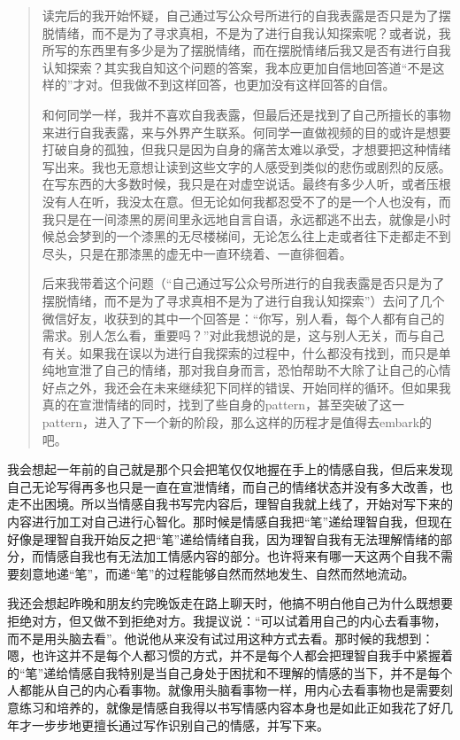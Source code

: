 \blockquote{
	读完后的我开始怀疑，自己通过写公众号所进行的自我表露是否只是为了摆脱情绪，而不是为了寻求真相，不是为了进行自我认知探索呢？或者说，我所写的东西里有多少是为了摆脱情绪，而在摆脱情绪后我又是否有进行自我认知探索？其实我自知这个问题的答案，我本应更加自信地回答道“不是这样的”才对。但我做不到这样回答，也更加没有这样回答的自信。

	和何同学一样，我并不喜欢自我表露，但最后还是找到了自己所擅长的事物来进行自我表露，来与外界产生联系。何同学一直做视频的目的或许是想要打破自身的孤独，但我只是因为自身的痛苦太难以承受，才想要把这种情绪写出来。我也无意想让读到这些文字的人感受到类似的悲伤或剧烈的反感。在写东西的大多数时候，我只是在对虚空说话。最终有多少人听，或者压根没有人在听，我没太在意。但无论如何我都忍受不了的是\pozhehao{}一个人也没有，而我只是在一间漆黑的房间里永远地自言自语，永远都逃不出去，就像是小时候总会梦到的一个漆黑的无尽楼梯间，无论怎么往上走或者往下走都走不到尽头，只是在那漆黑的虚无中一直环绕着、一直徘徊着。

	后来我带着这个问题（“自己通过写公众号所进行的自我表露是否只是为了摆脱情绪，而不是为了寻求真相\pozhehao{}不是为了进行自我认知探索”）去问了几个微信好友，收获到的其中一个回答是：“你写，别人看，每个人都有自己的需求。别人怎么看，重要吗？”对此我想说的是，这与别人无关，而与自己有关。如果我在误以为进行自我探索的过程中，什么都没有找到，而只是单纯地宣泄了自己的情绪，那对我自身而言，恐怕帮助不大\pozhehao{}除了让自己的心情好点之外，我还会在未来继续犯下同样的错误、开始同样的循环。但如果我真的在宣泄情绪的同时，找到了些自身的pattern，甚至突破了这一pattern，进入了下一个新的阶段，那么这样的历程才是值得去embark的吧。

}

我会想起一年前的自己就是那个只会把笔仅仅地握在手上的情感自我，但后来发现自己无论写得再多也只是一直在宣泄情绪，而自己的情绪状态并没有多大改善，也走不出困境。所以当情感自我书写完内容后，理智自我就上线了，开始对写下来的内容进行加工\pozhehao{}对自己进行心智化。那时候是情感自我把“笔”递给理智自我，但现在好像是理智自我开始反之把“笔”递给情绪自我，因为理智自我有无法理解情绪的部分，而情感自我也有无法加工情感内容的部分。也许将来有哪一天这两个自我不需要刻意地递“笔”，而递“笔”的过程能够自然而然地发生、自然而然地流动。

我还会想起昨晚和朋友约完晚饭走在路上聊天时，他搞不明白他自己为什么既想要拒绝对方，但又做不到拒绝对方。我提议说：“可以试着用自己的内心去看事物，而不是用头脑去看”。他说他从来没有试过用这种方式去看。那时候的我想到：嗯，也许这并不是每个人都习惯的方式，并不是每个人都会把理智自我手中紧握着的“笔”递给情感自我\pozhehao{}特别是当自己身处于困扰和不理解的情感的当下，并不是每个人都能从自己的内心看事物。就像用头脑看事物一样，用内心去看事物也是需要刻意练习和培养的，就像是情感自我得以书写情感内容本身也是如此\pozhehao{}正如我花了好几年才一步步地更擅长通过写作识别自己的情感，并写下来。


